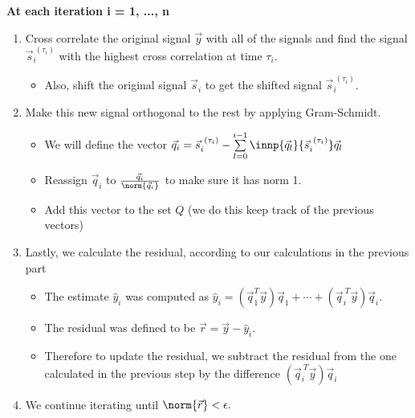 \begin{enumerate}
{    \textbf{At each iteration i = 1, ..., n}
    \begin{enumerate}[label=(\arabic*)]
      \item Cross correlate the original signal $\vec{y}$ with all of the signals and find the signal $\vec{s}_{i}^{\ ({\tau_{i}})}$ with the highest cross correlation at time $\tau_{i}.$
      \begin{itemize}
        \item Also, shift the original signal $\vec{s}_{i}$ to get the shifted signal $\vec{s}_{i}^{\ (\tau_{i})}.$
      \end{itemize}
      \item Make this new signal orthogonal to the rest by applying Gram-Schmidt. 
      \begin{itemize}
        \item We will define the vector $\vec{q}_{i} = \vec{s}_{i}^{\ (\tau_{i})} - \sum\limits_{l = 0}^{i - 1} \innp{\vec{q}_{l}}{\vec{s}_{i}^{\ (\tau_{i})}} \vec{q}_{l}$
        \item Reassign $\vec{q}_{i}$ to $\frac{\vec{q}_{i}}{\norm{\vec{q}_{i}}}$ to make sure it has norm 1.
        \item Add this vector to the set $Q$ (we do this keep track of the previous vectors)
      \end{itemize}
      \item Lastly, we calculate the residual, according to our calculations in the previous part
      \begin{itemize}
        \item The estimate $\hat{y}_{i}$ was computed as $\hat{y}_{i} = (\vec{q}_{1}^{T} \vec{y}) \vec{q}_{1} + \cdots + (\vec{q}_{i}^{\ T} \vec{y}) \vec{q}_{i}.$
        \item The residual was defined to be $\vec{r} = \vec{y} - \hat{y}_{i}.$ 
        \item Therefore to update the residual, we subtract the residual from the one calculated in the previous step by the difference $(\vec{q}_{i}^{\ T} \vec{y}) \vec{q}_{i}$
      \end{itemize}
      \item We continue iterating until $\norm{\vec{r}} < \epsilon.$
    \end{enumerate}
  }
\end{enumerate}